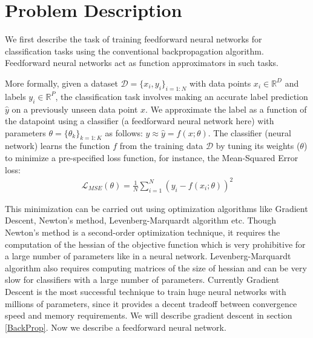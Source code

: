 \section{Problem Description}
\label{ProbDesc}

We first describe the task of training feedforward neural networks for classification tasks using the conventional backpropagation algorithm. Feedforward neural networks act as function approximators in such tasks.

More formally, given a dataset $ \mathcal{D} = \{x_i,y_i\}_{i=1:N}$ with data points $x_i \in \mathbb{R}^D$ and labels $y_i \in \mathbb{R}^P$, the classification task involves making an accurate label prediction $\hat{y}$ on a previously unseen data point $x$. We approximate the label as a function of the datapoint using a classifier (a feedforward neural network here) with parameters $\theta = \{\theta_k\}_{k=1:K}$ as follows: $y \approx \hat{y} = f(x; \theta)$.
The classifier (neural network) learns the function $f$ from the training data $\mathcal{D}$ by tuning its weights ($\theta$) to minimize a pre-specified loss function, for instance, the Mean-Squared Error loss:
\begin{align}
\mathcal{L}_{MSE} (\theta) = \frac{1}{N}\sum_{i=1}^N ( y_i - f(x_i; \theta))^2
\end{align}

This minimization can be carried out using optimization algorithms like Gradient Descent, Newton's method, Levenberg-Marquardt algorithm etc.
Though Newton's method is a second-order optimization technique, it requires the computation of the hessian of the objective function which is very prohibitive for a large number of parameters like in a neural network.
Levenberg-Marquardt algorithm also requires computing matrices of the size of hessian and can be very slow for classifiers with a large number of parameters.
Currently Gradient Descent is the most successful technique to train huge neural networks with millions of parameters, since it provides a decent tradeoff between convergence speed and memory requirements.
We will describe gradient descent in section \ref{BackProp}. Now we describe a feedforward neural network.

